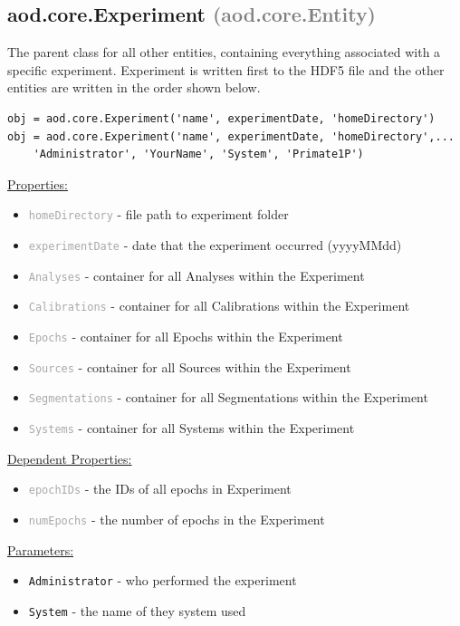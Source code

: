 \documentclass[10pt]{exam}
\newcommand\myparent[1]{\textcolor{gray}{(#1)}}
\newcommand\aodparam[1]{\textcolor{codepurple}{\texttt{#1}}}
\newcommand\aodprop[1]{\textcolor{darkgray}{\texttt{#1}}}
\newcommand\docheader[1]{\vspace{0.6ex}\noindent\underline{#1}\vspace{0.15ex}}
\begin{document}
	\subsection{aod.core.Experiment  \myparent{aod.core.Entity}}
		\noindent The parent class for all other entities, containing everything associated with a specific experiment. Experiment is written first to the HDF5 file and the other entities are written in the order shown below. 
			
		\begin{lstlisting}[style=matlab-editor, basicstyle=\mlttfamily\footnotesize]
obj = aod.core.Experiment('name', experimentDate, 'homeDirectory')
obj = aod.core.Experiment('name', experimentDate, 'homeDirectory',...
	'Administrator', 'YourName', 'System', 'Primate1P')
		\end{lstlisting}		
		\docheader{Properties:}
		\begin{itemize}
			\item \aodprop{homeDirectory} - file path to experiment folder
			\item \aodprop{experimentDate} - date that the experiment occurred (yyyyMMdd)
			\item \aodprop{Analyses} - container for all Analyses within the Experiment
			\item \aodprop{Calibrations} - container for all Calibrations within the Experiment
			\item \aodprop{Epochs} - container for all Epochs within the Experiment
			\item \aodprop{Sources} - container for all Sources within the Experiment
			\item \aodprop{Segmentations} - container for all Segmentations within the Experiment
			\item \aodprop{Systems} - container for all Systems within the Experiment
		\end{itemize}		
		\docheader{Dependent Properties:}
		\begin{itemize}
			\item \aodprop{epochIDs} - the IDs of all epochs in Experiment
			\item \aodprop{numEpochs} - the number of epochs in the Experiment
		\end{itemize}
		\docheader{Parameters:}
		\begin{itemize}
			\item \aodparam{Administrator} - who performed the experiment
			\item \aodparam{System} - the name of they system used
		\end{itemize}
\end{document}
